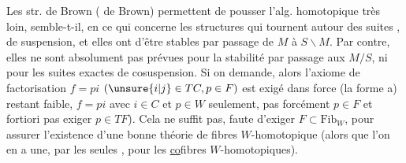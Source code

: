 

Les str. de Brown ( de Brown) permettent de pousser l'alg. homotopique très loin, semble-t-il, en ce qui concerne les structures  qui tournent autour des suites , de suspension, et elles ont   d'être stables par passage de $M$ à $S\backslash M$. Par contre, elles ne sont absolument pas prévues pour la stabilité par passage aux $M/S$, ni pour les suites exactes de cosuspension.  Si on   demande, alors l'axiome de factorisation  $f=pi$ $(\unsure{i|j}\in TC,p\in F)$ est exigé dans   force (la forme a) restant faible, $f=pi$ avec $i\in C$ et $p\in W$ seulement, pas forcément $p\in F$ et   fortiori pas  exiger $p\in TF$). Cela ne suffit pas,  faute d'exiger $F\subset\mathrm{Fib}_W$, pour assurer l'existence d'une bonne théorie de fibres $W$-homotopique (alors que l'on en a une, par les seules , pour les \uline{co}fibres $W$-homotopiques).


